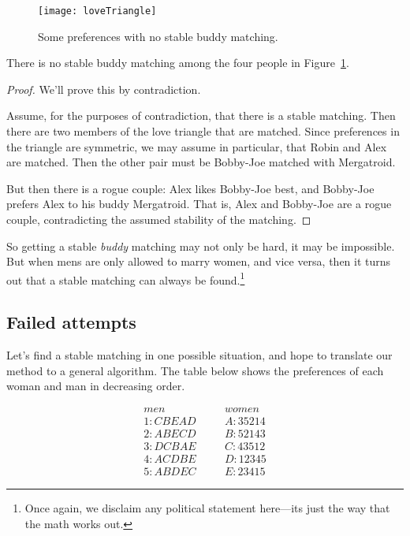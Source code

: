 \begin{figure}[htbp]\redrawn


\texttt{[image: loveTriangle]}

\caption{Some preferences with no stable buddy matching.}
\label{fig:buddy}
\end{figure}

\begin{lemma}\label{lem:nostablematch}
There is no stable buddy matching among the four people in
Figure~\ref{fig:buddy}.
\end{lemma}

\begin{proof}
We'll prove this by contradiction.

Assume, for the purposes of contradiction, that there is a stable
matching.  Then there are two members of the love triangle that are
matched.  Since preferences in the triangle are symmetric, we may assume
in particular, that Robin and Alex are matched.  Then the other pair must
be Bobby-Joe matched with Mergatroid.

But then there is a rogue couple: Alex likes Bobby-Joe best, and Bobby-Joe
prefers Alex to his buddy Mergatroid.  That is, Alex and Bobby-Joe are a
rogue couple, contradicting the assumed stability of the matching.
\end{proof}

So getting a stable \emph{buddy} matching may not only be hard, it may
be impossible.  But when mens are only allowed to marry women, and
vice versa, then it turns out that a stable matching can always be
found.\footnote{Once again, we disclaim any political statement
  here---its just the way that the math works out.}


\iffalse

\subsection{Failed attempts}

Let's find a stable matching in one possible situation, and hope to
translate our method to a general algorithm.  The table below shows the
preferences of each woman and man in decreasing order.

\begin{eqnarray*}
men & \quad & women \\
1 : C B E A D & \quad & A : 3 5 2 1 4 \\
2 : A B E C D & \quad & B : 5 2 1 4 3 \\
3 : D C B A E & \quad & C : 4 3 5 1 2 \\
4 : A C D B E & \quad & D : 1 2 3 4 5 \\
5 : A B D E C & \quad & E : 2 3 4 1 5
\end{eqnarray*}

